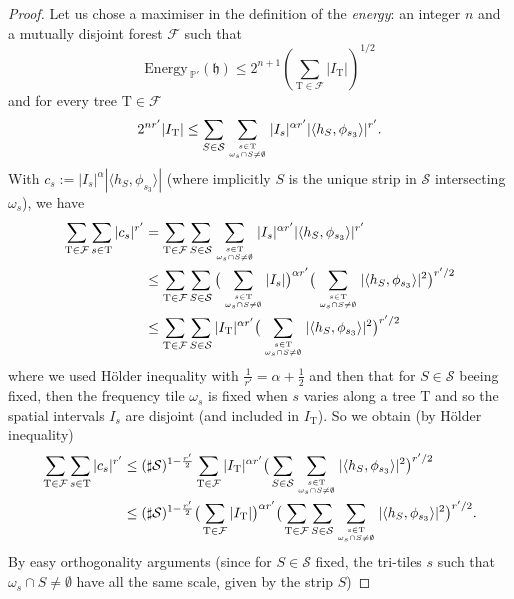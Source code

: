 \documentclass[a4paper,11pt,oneside]{amsart}
\newcommand{\hh}{\mathfrak{h}}
\newcommand{\PP}{\mathbb{P}}
\newcommand{\FF}{\mathcal{F}}
\newcommand{\TT}{\mathrm{T}}
\newcommand{\energy}{\mathrm{Energy \,}}
\theoremstyle{plain}
\theoremstyle{definition}
\begin{document}
\begin{proof}
Let us chose a maximiser in the definition of the {\it energy}: an integer $n$ and a mutually disjoint forest $\FF$ such that 
$$\energy_{\PP'}(\hh) \leq 2^{n+1}\left(\sum_{\TT \in \FF} |I_{\TT}| \right)^{1/2}$$
and for every tree $\TT\in\FF$
$$ 2^{n r'} |I_{\TT}| \leq \sum_{S\in{\mathcal S}} \sum_{s\in\TT \atop \omega_s \cap S \neq \emptyset} |I_s|^{\alpha r'} |\langle h_S,\phi_{s_3}\rangle|^{r'}.$$
With $c_s:=|I_s|^{\alpha} |\langle h_S, \phi_{s_3}\rangle |$ (where implicitly $S$ is the unique strip in ${\mathcal S}$ intersecting $\omega_{s}$), we have
\begin{align*}
\sum_{\TT\in \FF} \sum_{s\in \TT} |c_s|^{r'} & =
\sum_{\TT\in \FF} \sum_{S\in {\mathcal S}} \sum_{s\in \TT \atop \omega_s \cap S \neq\emptyset} |I_s|^{\alpha r'} |\langle h_S,\phi_{s_3}\rangle|^{r'} \\
& \leq
\sum_{\TT\in \FF} \sum_{S\in {\mathcal S}} \big(\sum_{s\in \TT \atop \omega_s \cap S \neq\emptyset} |I_s|\big)^{\alpha r'} \big(\sum_{s\in \TT \atop \omega_s \cap S \neq\emptyset} |\langle h_S,\phi_{s_3}\rangle|^{2}\big)^{r'/2} \\
& \leq
\sum_{\TT\in \FF} \sum_{S\in {\mathcal S}} |I_{\TT}|^{\alpha r'} \big(\sum_{s\in \TT \atop \omega_s \cap S \neq\emptyset} |\langle h_S,\phi_{s_3}\rangle|^{2}\big)^{r'/2} \\
\end{align*}
where we used H\"older inequality with $\frac{1}{r'}=\alpha+\frac{1}{2}$ and then that for $S\in{\mathcal S}$ beeing fixed, then the frequency tile $\omega_s$ is fixed when $s$ varies along a tree $\TT$ and so the spatial intervals $I_s$ are disjoint (and included in $I_{\TT}$).
So we obtain (by H\"older inequality)
\begin{align*}
\sum_{\TT\in \FF} \sum_{s\in \TT} |c_s|^{r'} & \leq (\sharp {\mathcal S})^{1-\frac{r'}{2}}
\sum_{\TT\in \FF} |I_{\TT}|^{\alpha r'} \big(\sum_{S\in {\mathcal S}} \sum_{s\in \TT \atop \omega_s \cap S \neq\emptyset} |\langle h_S,\phi_{s_3}\rangle|^{2}\big)^{r'/2} \\
& \leq (\sharp {\mathcal S})^{1-\frac{r'}{2}}
\big(\sum_{\TT\in \FF} |I_{\TT}|\big)^{\alpha r'} \big(\sum_{\TT\in \FF} \sum_{S\in {\mathcal S}} \sum_{s\in \TT \atop \omega_s \cap S \neq\emptyset} |\langle h_S,\phi_{s_3}\rangle|^{2}\big)^{r'/2}.
\end{align*}
By easy orthogonality arguments (since for $S\in{\mathcal S}$ fixed, the tri-tiles $s$ such that $\omega_s\cap S\neq \emptyset$ have all the same scale, given by the strip $S$)

\end{proof}
\end{document}
